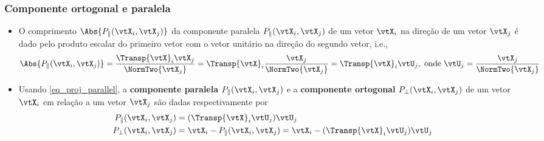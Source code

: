 \begin{frame}
  \frametitle{Componente ortogonal e paralela}
  \begin{itemize}
    \item O comprimento $\Abs{P_{\parallel}(\vtX_i, \vtX_j)}$ da componente paralela $P_{\parallel}(\vtX_i, \vtX_j)$ de um vetor $\vtX_i$ na direção de um vetor $\vtX_j$ é dado pelo produto escalar do primeiro vetor com o vetor unitário na direção do segundo vetor, i.e.,
    \begin{equation}\label{eq_proj_parallel}
      \Abs{P_{\parallel}(\vtX_i, \vtX_j)} = \frac{\Transp{\vtX}_i\vtX_j}{\NormTwo{\vtX_j}} = \Transp{\vtX}_i\frac{\vtX_j}{\NormTwo{\vtX_j}} = \Transp{\vtX}_i\vtU_j, \text{ onde } \vtU_j = \frac{\vtX_j}{\NormTwo{\vtX_j}}
    \end{equation}
    \item Usando \eqref{eq_proj_parallel}, a \textbf{\alert{componente paralela}} $P_{\parallel}(\vtX_i, \vtX_j)$ e a \textbf{\alert{componente ortogonal}} $P_{\perp}(\vtX_i, \vtX_j)$ de um vetor $\vtX_i$ em relação a um vetor $\vtX_j$ são dadas respectivamente por
    \begin{subequations}
      \begin{align}
        P_{\parallel}(\vtX_i, \vtX_j) &= (\Transp{\vtX}_i\vtU_j)\vtU_j \\
        P_{\perp}(\vtX_i, \vtX_j) &= \vtX_i - P_{\parallel}(\vtX_i, \vtX_j) = \vtX_i - (\Transp{\vtX}_i\vtU_j)\vtU_j
      \end{align}
    \end{subequations}
  \end{itemize}
\end{frame}

